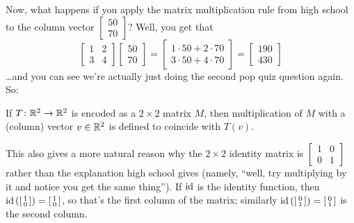Now, what happens if you apply the matrix multiplication rule from high school to
the column vector $\left[ \begin{smallmatrix} 50 \\ 70 \end{smallmatrix} \right]$?
Well, you get that
\[
	\begin{bmatrix} 1 & 2 \\ 3 & 4 \end{bmatrix}
	\begin{bmatrix} 50 \\ 70 \end{bmatrix}
	= \begin{bmatrix} 1 \cdot 50 + 2 \cdot 70 \\ 3 \cdot 50 + 4 \cdot 70 \end{bmatrix}
	= \begin{bmatrix} 190 \\ 430 \end{bmatrix}
\]
\dots and you can see we're actually just doing the second pop quiz question again.
So:
\begin{moral}
	If $T \colon \mathbb R^2 \to \mathbb R^2$ is encoded as a $2 \times 2$ matrix $M$,
	then multiplication of $M$ with a (column) vector $v \in \mathbb R^2$
	is defined to coincide with $T(v)$.
\end{moral}
\begin{remark}
	This also gives a more natural reason why the $2 \times 2$ identity matrix
	is $\left[ \begin{smallmatrix} 1 & 0 \\ 0 & 1 \end{smallmatrix} \right]$
	rather than the explanation high school gives
	(namely, ``well, try multiplying by it and notice you get the same thing'').
	If $\mathrm{id}$ is the identity function, then
	$\mathrm{id}\left( \left[ \begin{smallmatrix} 1 \\ 0 \end{smallmatrix} \right] \right)
	= \left[ \begin{smallmatrix} 1 \\ 0 \end{smallmatrix} \right]$,
	so that's the first column of the matrix;
	similarly
	$\mathrm{id}\left( \left[ \begin{smallmatrix} 0 \\ 1 \end{smallmatrix} \right] \right)
	= \left[ \begin{smallmatrix} 0 \\ 1 \end{smallmatrix} \right]$
	is the second column.
\end{remark}

